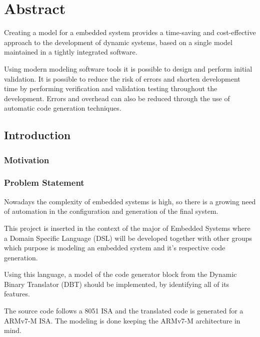 \documentclass{report}
\begin{document}
	\newpage
  
	\tableofcontents
	
	\newpage
	
    
    \chapter{Abstract}
    
    \par Creating a model for a embedded system provides a time-saving and cost-effective approach to the development of dynamic systems, based on a single model maintained in a tightly integrated software. 
    \par Using modern modeling software tools it is possible to design and perform initial validation. It is possible to reduce the risk of errors and shorten development time by performing verification and validation testing throughout the development. Errors and overhead can also be reduced through the use of automatic code generation techniques\cite{modelling-embsys}.
   
	\section{Introduction}
	
	\par 
    
    \subsection{Motivation}
    
    \par 
    
    \subsection{Problem Statement}
    
    \par Nowadays the complexity of embedded systems is high, so there is a growing need of automation in the configuration and generation of the final system.
	\par This project is inserted in the context of the major of Embedded Systems where a Domain Specific Language (DSL) will be developed together with other groups which purpose is modeling an embedded system and it’s respective code generation. 
	\par Using this language, a model of the code generator block from the Dynamic Binary Translator (DBT) should be implemented, by identifying all of its features.
    \par The source code follows a 8051 ISA and the translated code is generated for a ARMv7-M ISA. The modeling is done keeping the ARMv7-M architecture in mind.
\end{document}
